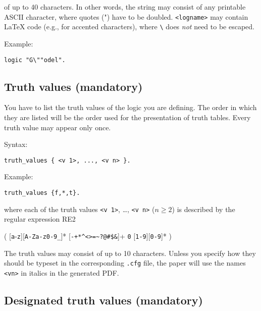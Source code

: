 \documentclass[]{article}
\begin{document}
of up to 40 characters. In other words, the string may consist of any
printable ASCII character, where quotes (") have to be doubled.
\texttt{\textless{}logname\textgreater{}} may contain LaTeX code (e.g.,
for accented characters), where \texttt{\textbackslash{}} does
\emph{not} need to be escaped.

Example:

\begin{verbatim}
logic "G\""odel".
\end{verbatim}

\hypertarget{truth-values-mandatory}{%
\subsection{Truth values (mandatory)}\label{truth-values-mandatory}}

You have to list the truth values of the logic you are defining. The
order in which they are listed will be the order used for the
presentation of truth tables. Every truth value may appear only once.

Syntax:

\begin{verbatim}
truth_values { <v 1>, ..., <v n> }.
\end{verbatim}

Example:

\begin{verbatim}
truth_values {f,*,t}.
\end{verbatim}

where each of the truth values \texttt{\textless{}v\ 1\textgreater{}},
\ldots{}, \texttt{\textless{}v\ n\textgreater{}} (\(n \ge 2\)) is
described by the regular expression RE2

( {[}\texttt{a}-\texttt{z}{]}{[}\texttt{A-Za-z0-9\_}{]}* \textbar{}
{[}\texttt{-+*\^{}\textless{}\textgreater{}=\textasciitilde{}?@\#\$\&}{]}+
\textbar{} \texttt{0} \textbar{} {[}\texttt{1-9}{]}{[}\texttt{0-9}{]}* )

The truth values may consist of up to 10 characters. Unless you specify
how they should be typeset in the corresponding \texttt{.cfg} file, the
paper will use the names \texttt{\textless{}vn\textgreater{}} in italics
in the generated PDF.

\hypertarget{designated-truth-values-mandatory}{%
\subsection{Designated truth values
(mandatory)}\label{designated-truth-values-mandatory}}
\end{document}
